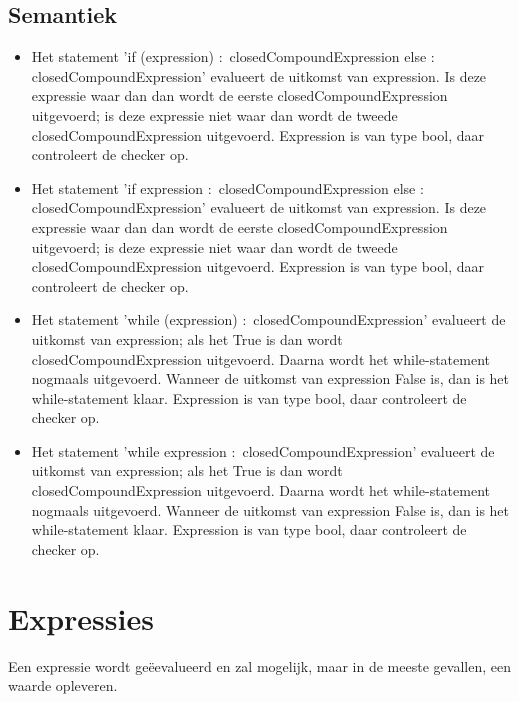     \subsection{Semantiek}
        \begin{itemize}
        \item Het statement 'if (expression) $\colon$ closedCompoundExpression else $\colon$ closedCompoundExpression' evalueert de uitkomst van expression. Is deze expressie waar dan dan wordt de eerste closedCompoundExpression uitgevoerd; is deze expressie niet waar dan wordt de tweede closedCompoundExpression uitgevoerd. Expression is van type bool, daar controleert de checker op.
        \item Het statement 'if expression $\colon$ closedCompoundExpression else $\colon$ closedCompoundExpression' evalueert de uitkomst van expression. Is deze expressie waar dan dan wordt de eerste closedCompoundExpression uitgevoerd; is deze expressie niet waar dan wordt de tweede closedCompoundExpression uitgevoerd. Expression is van type bool, daar controleert de checker op.
        \item Het statement 'while (expression) $\colon$ closedCompoundExpression' evalueert de uitkomst van expression; als het True is dan wordt closedCompoundExpression uitgevoerd. Daarna wordt het while-statement nogmaals uitgevoerd. Wanneer de uitkomst van expression False is, dan is het while-statement klaar. Expression is van type bool, daar controleert de checker op.
        \item Het statement 'while expression $\colon$ closedCompoundExpression' evalueert de uitkomst van expression; als het True is dan wordt closedCompoundExpression uitgevoerd. Daarna wordt het while-statement nogmaals uitgevoerd. Wanneer de uitkomst van expression False is, dan is het while-statement klaar. Expression is van type bool, daar controleert de checker op.
        \end{itemize}

\section{Expressies}
Een expressie wordt ge\"{e}evalueerd en zal mogelijk, maar in de meeste gevallen, een waarde opleveren.
